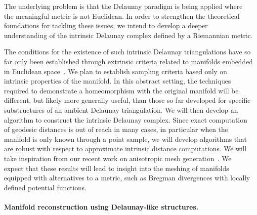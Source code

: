 The underlying problem is that the Delaunay paradigm is being applied
where the meaningful metric is not Euclidean.  In order to strengthen
the theoretical foundations for tackling these issues, we intend to
develop a deeper understanding of the intrinsic Delaunay complex
defined by a Riemannian metric.
%

The conditions for the existence of such intrinsic Delaunay
triangulations have so far only been established through extrinsic
criteria related to manifolds embedded in Euclidean space~\cite{boissonnat2012stab}. We plan to
establish sampling criteria based only on intrinsic properties of the
manifold. In this abstract setting, the techniques required to
demonstrate a homeomorphism with the original manifold will be
different, but likely more generally useful, than those so far
developed for specific substructures of an ambient Delaunay
triangulation.  We will then develop an algorithm to construct the
intrinsic Delaunay complex.  Since exact computation of geodesic
distances is out of reach in many cases, in particular when the
manifold is only known through a point sample, we will develop
algorithms that are robust with respect to approximate intrinsic
distance computations. We will take inspiration from our recent work
on anisotropic mesh generation~\cite{bwy-luam-08}.
We expect that these results will lead to insight into the meshing of
manifolds equipped with alternatives to a metric, such as Bregman
divergences with locally defined potential functions.

\paragraph{Manifold reconstruction using Delaunay-like structures.}

